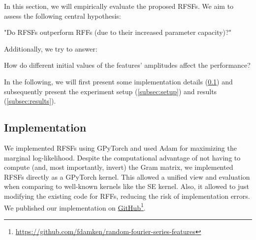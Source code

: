 In this section, we will empirically evaluate the proposed \acp{RFSF}.
We aim to assess the following central hypothesis:
\begin{hypothesis}
	"Do \acp{RFSF} outperform \acp{RFF} (due to their increased parameter capacity)?"
	\label{hyp:rfsfAreBetter}
\end{hypothesis}
Additionally, we try to answer:
\begin{hypothesis}
	How do different initial values of the features' amplitudes affect the performance?
	\label{hyp:initialValues}
\end{hypothesis}
In the following, we will first present some implementation details (\cref{subsec:impl}) and subsequently present the experiment setup (\cref{subsec:setup}) and results (\cref{subsec:results}).


\subsection{Implementation}  \label{subsec:impl}
	We implemented \acp{RFSF} using GPyTorch\cite{jacotNeuralTangentKernel2020} and used Adam\cite{kingmaAdamMethodStochastic2017a} for maximizing the marginal log-likelihood.
	Despite the computational advantage of not having to compute (and, most importantly, invert) the Gram matrix, we implemented \acp{RFSF} directly as a GPyTorch kernel.
	This allowed a unified view and evaluation when comparing to well-known kernels like the \ac{SE} kernel.
	Also, it allowed to just modifying the existing code for \acp{RFF}, reducing the risk of implementation errors.
	We published our implementation on \href{https://github.com/fdamken/random-fourier-series-features}{GitHub}\footnote{\url{https://github.com/fdamken/random-fourier-series-features}}.


